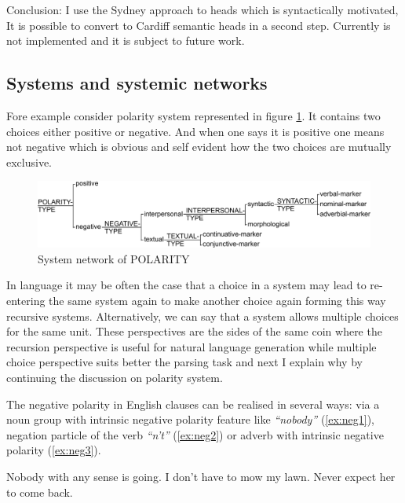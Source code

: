 Conclusion: 
I use the Sydney approach to heads which is syntactically motivated, It is possible to convert to Cardiff semantic heads in a second step. Currently is not implemented and it is subject to future work. 

\subsection{Systems and systemic networks}

Fore example consider polarity system represented in figure \ref{fig:polarity}. It contains two choices either positive or negative. And when one says it is positive one means not negative which is obvious and self evident how the two choices are mutually exclusive.

\begin{figure}[H]
	\centering
	\includegraphics[width=\textwidth]{Figures/SFL-grammar/polarity-system.pdf}
	\caption{System network of POLARITY}
	\label{fig:polarity}
\end{figure}

In language it may be often the case that a choice in a system may lead to re-entering the same system again to make another choice again forming this way recursive systems. Alternatively, we can say that a system allows multiple choices for the same unit. These perspectives are the sides of the same coin where the recursion perspective is useful for natural language generation while multiple choice perspective suits better the parsing task and next I explain why by continuing the discussion on polarity system. 

The negative polarity in English clauses can be realised in several ways: via a noun group with intrinsic negative polarity feature like \textit{``nobody''} (\ref{ex:neg1}), negation particle of the verb \textit{``n't''} (\ref{ex:neg2}) or adverb with intrinsic negative polarity (\ref{ex:neg3}). 

\begin{exe}
	\ex\label{ex:neg1} Nobody with any sense is going. 
	\ex\label{ex:neg2} I don't have to mow my lawn.
	\ex\label{ex:neg3} Never expect her to come back.
\end{exe}

